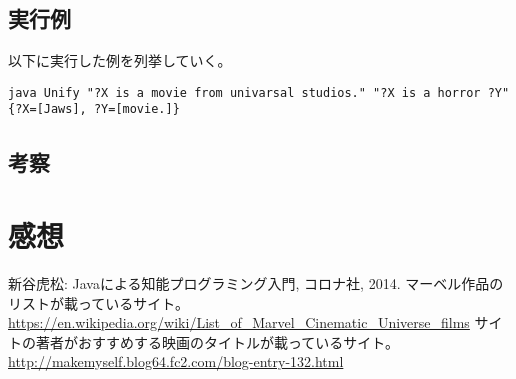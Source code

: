 \documentclass[a4j]{jarticle}
\begin{document}
\subsection{実行例}
以下に実行した例を列挙していく。
\begin{lstlisting}
java Unify "?X is a movie from univarsal studios." "?X is a horror ?Y"
{?X=[Jaws], ?Y=[movie.]}
\end{lstlisting}
\subsection{考察}

\section{感想}

\begin{thebibliography}{11}
 新谷虎松: Javaによる知能プログラミング入門, コロナ社, 2014.
 マーベル作品のリストが載っているサイト。\url{https://en.wikipedia.org/wiki/List_of_Marvel_Cinematic_Universe_films}
 サイトの著者がおすすめする映画のタイトルが載っているサイト。\url{http://makemyself.blog64.fc2.com/blog-entry-132.html}
\end{thebibliography}
\end{document}
